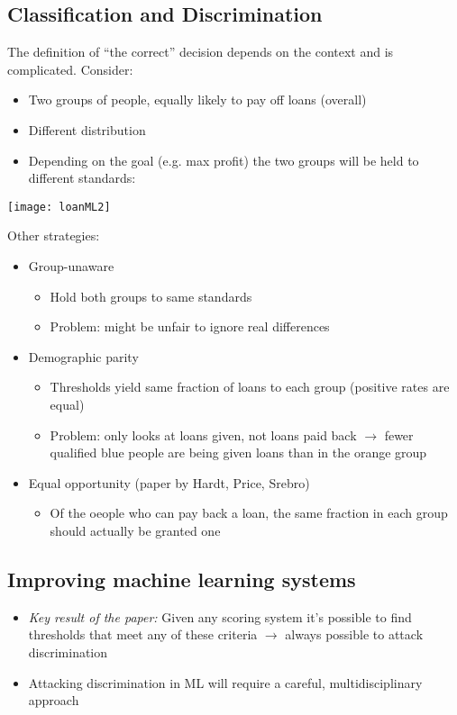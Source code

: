 \documentclass[12pt,a4paper]{article}
\begin{document}
\subsection{Classification and Discrimination}
The definition of ``the correct'' decision depends on the context and is complicated. Consider:
\begin{itemize}
\item Two groups of people, equally likely to pay off loans (overall)
\item Different distribution
\item Depending on the goal (e.g. max profit) the two groups will be held to different standards:
\end{itemize}
\texttt{[image: loanML2]}
\begin{description}
\item Other strategies:
\end{description}
\begin{itemize}
\item Group-unaware
\begin{itemize}
\item Hold both groups to same standards 
\item Problem: might be unfair to ignore real differences
\end{itemize}
\item Demographic parity 
\begin{itemize}
\item Thresholds yield same fraction of loans to each group (positive rates are equal)
\item Problem: only looks at loans given, not loans paid back \(\rightarrow\) fewer qualified blue people are being given loans than in the orange group
\end{itemize}
\item Equal opportunity (paper by Hardt, Price, Srebro)
\begin{itemize}
\item Of the oeople who can pay back a loan, the same fraction in each group should actually be granted one
\end{itemize}
\end{itemize}
\subsection{Improving machine learning systems}
\begin{itemize}
\item \textit{Key result of the paper:} Given any scoring system it's possible to find thresholds that meet any of these criteria \(\rightarrow\) always possible to attack discrimination
\item Attacking discrimination in ML will require a careful, multidisciplinary approach
\end{itemize}
\end{document}

